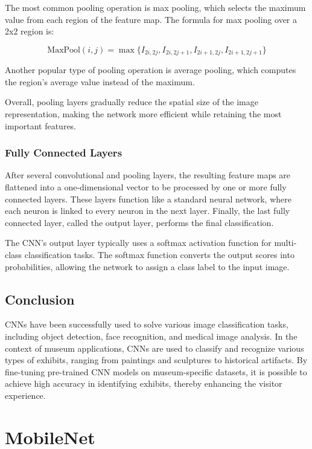 The most common pooling operation is max pooling, which selects the maximum value from each region of the feature map. The formula for max pooling over a 2x2 region is:

\[
\text{MaxPool}(i,j) = \max \{ I_{2i,2j}, I_{2i,2j+1}, I_{2i+1,2j}, I_{2i+1,2j+1} \}
\]

Another popular type of pooling operation is average pooling, which computes the region's average value instead of the maximum.

Overall, pooling layers gradually reduce the spatial size of the image representation, making the network more efficient while retaining the most important features. 

\subsubsection{Fully Connected Layers}

After several convolutional and pooling layers, the resulting feature maps are flattened into a one-dimensional vector to be processed by one or more fully connected layers. These layers function like a standard neural network, where each neuron is linked to every neuron in the next layer. Finally, the last fully connected layer, called the output layer, performs the final classification.

The CNN's output layer typically uses a softmax activation function for multi-class classification tasks. The softmax function converts the output scores into probabilities, allowing the network to assign a class label to the input image.

\subsection{Conclusion}

CNNs have been successfully used to solve various image classification tasks, including object detection, face recognition, and medical image analysis. In the context of museum applications, CNNs are used to classify and recognize various types of exhibits, ranging from paintings and sculptures to historical artifacts. By fine-tuning pre-trained CNN models on museum-specific datasets, it is possible to achieve high accuracy in identifying exhibits, thereby enhancing the visitor experience.

\section{MobileNet}


